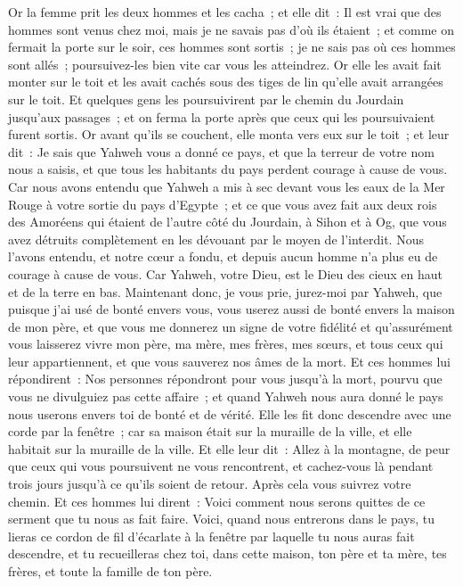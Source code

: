 \begin{multicols}{2}
Or la femme prit les deux hommes et les cacha~; et elle dit~: Il est vrai que des hommes sont venus chez moi, mais je ne savais pas d'où ils étaient~;
et comme on fermait la porte sur le soir, ces hommes sont sortis~; je ne sais pas où ces hommes sont allés~; poursuivez-les bien vite car vous les atteindrez.
Or elle les avait fait monter sur le toit et les avait cachés sous des tiges de lin qu'elle avait arrangées sur le toit.
Et quelques gens les poursuivirent par le chemin du Jourdain jusqu'aux passages~; et on ferma la porte après que ceux qui les poursuivaient furent sortis.
Or avant qu'ils se couchent, elle monta vers eux sur le toit~;
et leur dit~: Je sais que Yahweh vous a donné ce pays, et que la terreur de votre nom nous a saisis, et que tous les habitants du pays perdent courage à cause de vous.
Car nous avons entendu que Yahweh a mis à sec devant vous les eaux de la Mer Rouge à votre sortie du pays d'Egypte~; et ce que vous avez fait aux deux rois des Amoréens qui étaient de l'autre côté du Jourdain, à Sihon et à Og, que vous avez détruits complètement en les dévouant par le moyen de l'interdit.
Nous l'avons entendu, et notre cœur a fondu, et depuis aucun homme n'a plus eu de courage à cause de vous. Car Yahweh, votre Dieu, est le Dieu des cieux en haut et de la terre en bas.
Maintenant donc, je vous prie, jurez-moi par Yahweh, que puisque j'ai usé de bonté envers vous, vous userez aussi de bonté envers la maison de mon père, 
et que vous me donnerez un signe de votre fidélité et qu'assurément vous laisserez vivre mon père, ma mère, mes frères, mes sœurs, et tous ceux qui leur appartiennent, et que vous sauverez nos âmes de la mort.
Et ces hommes lui répondirent~: Nos personnes répondront pour vous jusqu'à la mort, pourvu que vous ne divulguiez pas cette affaire~; et quand Yahweh nous aura donné le pays nous userons envers toi de bonté et de vérité. 
Elle les fit donc descendre avec une corde par la fenêtre~; car sa maison était sur la muraille de la ville, et elle habitait sur la muraille de la ville. 
Et elle leur dit~: Allez à la montagne, de peur que ceux qui vous poursuivent ne vous rencontrent, et cachez-vous là pendant trois jours jusqu'à ce qu'ils soient de retour. Après cela vous suivrez votre chemin.
Et ces hommes lui dirent~: Voici comment nous serons quittes de ce serment que tu nous as fait faire.
Voici, quand nous entrerons dans le pays, tu lieras ce cordon de fil d'écarlate à la fenêtre par laquelle tu nous auras fait descendre, et tu recueilleras chez toi, dans cette maison, ton père et ta mère, tes frères, et toute la famille de ton père.

\end{multicols}
